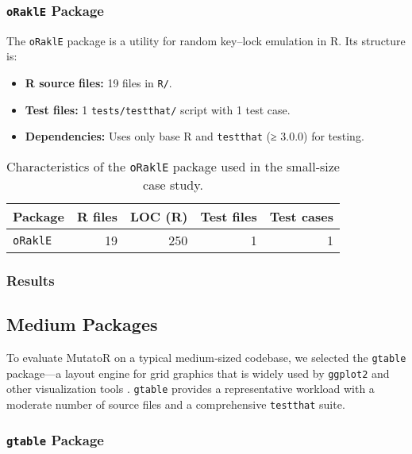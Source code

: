 \subsubsection{\texttt{oRaklE} Package}

The \texttt{oRaklE} package is a utility for random key–lock emulation in R. Its structure is:

\begin{itemize}
  \item \textbf{R source files:} 19 files in \texttt{R/}.  
  \item \textbf{Test files:} 1 \texttt{tests/testthat/} script with 1 test case.  
  \item \textbf{Dependencies:} Uses only base R and \texttt{testthat} (≥ 3.0.0) for testing.
\end{itemize}

\begin{table}[htbp]
  \centering
  \begin{tabular}{lrrrr}
    \hline\hline
    Package & R files & LOC (R) & Test files & Test cases \\
    \hline
    \texttt{oRaklE} & 19 & 250 & 1 & 1 \\
    \hline
  \end{tabular}
  \caption{Characteristics of the \texttt{oRaklE} package used in the small‐size case study.}
  \label{tab:orakle-metrics}
\end{table}

\subsubsection{Results}

\subsection{Medium Packages}

To evaluate MutatoR on a typical medium‐sized codebase, we selected the \texttt{gtable} package—a layout engine for grid graphics that is widely used by \texttt{ggplot2} and other visualization tools \cite{rlib-gtable}.  \texttt{gtable} provides a representative workload with a moderate number of source files and a comprehensive \texttt{testthat} suite.

\subsubsection{\texttt{gtable} Package}

